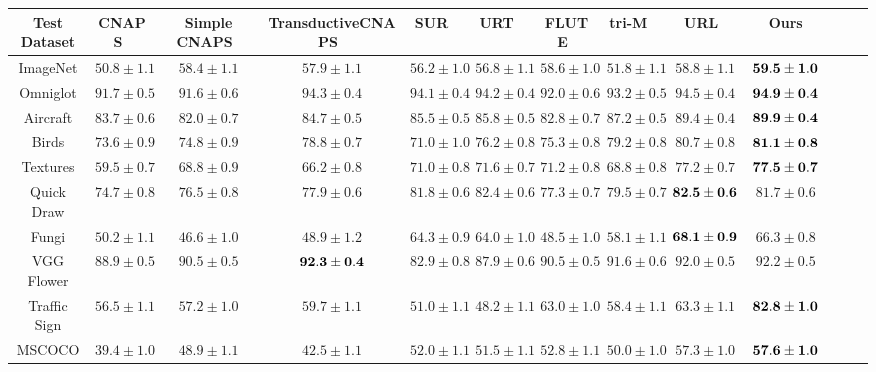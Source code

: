 \begin{table*}[t]
	\centering
    \resizebox{0.9\textwidth}{!}
    {
		\begin{tabular}{ccccccccccccc}

		    \toprule
		    Test Dataset & CNAPS~\cite{requeima2019fast} & Simple CNAPS~\cite{bateni2020improved} & TransductiveCNAPS~\cite{bateni2020enhancing} & SUR~\cite{dvornik2020selecting} & URT~\cite{liu2020universal} & FLUTE~\cite{triantafillou2021flute} & tri-M~\cite{liu2021multi} & URL~\cite{li2021universal} & Ours\\
		    \midrule
			ImageNet & $50.8 \pm 1.1$ & $58.4 \pm 1.1$ & $57.9 \pm 1.1$ & $56.2 \pm 1.0$ & $56.8 \pm 1.1$ & $58.6 \pm 1.0$ & $51.8 \pm 1.1$ & $58.8 \pm 1.1$ & ${\bf 59.5 \pm 1.0}$ \\
			Omniglot & $91.7 \pm 0.5$ & $91.6 \pm 0.6$ & $94.3 \pm 0.4$ & $94.1 \pm 0.4$ & $94.2 \pm 0.4$ & $92.0 \pm 0.6$ & $93.2 \pm 0.5$ & $94.5 \pm 0.4$ & ${\bf 94.9 \pm 0.4}$ \\
			Aircraft & $83.7 \pm 0.6$ & $82.0 \pm 0.7$ & $84.7 \pm 0.5$ & $85.5 \pm 0.5$ & $85.8 \pm 0.5$ & $82.8 \pm 0.7$ & $87.2 \pm 0.5$ & $89.4 \pm 0.4$ & ${\bf 89.9 \pm 0.4}$ \\
			Birds & $73.6 \pm 0.9$ & $74.8 \pm 0.9$ & $78.8 \pm 0.7$ & $71.0 \pm 1.0$ & $76.2 \pm 0.8$ & $75.3 \pm 0.8$ & $79.2 \pm 0.8$ & $80.7 \pm 0.8$ & ${\bf 81.1 \pm 0.8}$ \\
			Textures & $59.5 \pm 0.7$ & $68.8 \pm 0.9$ & $66.2 \pm 0.8$ & $71.0 \pm 0.8$ & $71.6 \pm 0.7$ & $71.2 \pm 0.8$ & $68.8 \pm 0.8$ & $77.2 \pm 0.7$ & ${\bf 77.5 \pm 0.7}$ \\
			Quick Draw & $74.7 \pm 0.8$ & $76.5 \pm 0.8$ & $77.9 \pm 0.6$ & $81.8 \pm 0.6$ & $82.4 \pm 0.6$ & $77.3 \pm 0.7$ & $79.5 \pm 0.7$ & ${\bf 82.5 \pm 0.6}$ & $81.7 \pm 0.6$ \\
			Fungi & $50.2 \pm 1.1$ & $46.6 \pm 1.0$ & $48.9 \pm 1.2$ & $64.3 \pm 0.9$ & $64.0 \pm 1.0$ & $48.5 \pm 1.0$ & $58.1 \pm 1.1$ & ${\bf 68.1 \pm 0.9}$ & $66.3 \pm 0.8$ \\
			VGG Flower & $88.9 \pm 0.5$ & $90.5 \pm 0.5$ & ${\bf 92.3 \pm 0.4}$ & $82.9 \pm 0.8$ & $87.9 \pm 0.6$ & $90.5 \pm 0.5$ & $91.6 \pm 0.6$ & $92.0 \pm 0.5$ & $92.2 \pm 0.5$ \\
			\midrule
			Traffic Sign & $56.5 \pm 1.1$ & $57.2 \pm 1.0$ & $59.7 \pm 1.1$ & $51.0 \pm 1.1$ & $48.2 \pm 1.1$ & $63.0 \pm 1.0$ & $58.4 \pm 1.1$ & $63.3 \pm 1.1$ & ${\bf 82.8 \pm 1.0}$ \\
			MSCOCO & $39.4 \pm 1.0$ & $48.9 \pm 1.1$ & $42.5 \pm 1.1$ & $52.0 \pm 1.1$ & $51.5 \pm 1.1$ & $52.8 \pm 1.1$ & $50.0 \pm 1.0$ & $57.3 \pm 1.0$ & ${\bf 57.6 \pm 1.0}$ \\

\end{tabular}}
\end{table*}
